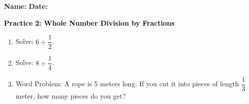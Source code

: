 \documentclass[12pt, letterpaper, fleqn]{article}
\begin{document}
\textbf{Name:} \underline{\hspace{5cm}}
\hfill
\textbf{Date:} \underline{\hspace{3cm}}\\

\begin{tcolorbox}[colback=customteal!20]
    \large\textcolor{black}{\textbf{Practice 2: Whole Number Division by Fractions}}
\end{tcolorbox}
\begin{enumerate}[itemsep=3.5cm, leftmargin=0.6cm]
\item Solve: $6 \div \dfrac{1}{2}$.
\vspace{3.5cm}
\item Solve: $8 \div \dfrac{1}{4}$.
\vspace{3.5cm}
\item Word Problem: A rope is 5 meters long. If you cut it into pieces of length $\dfrac{1}{3}$ meter, how many pieces do you get?
\end{enumerate}
\end{document}
